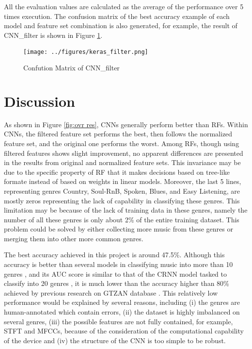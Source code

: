 \documentclass[sigconf ,nonacm]{acmart}
\begin{document}
All the evaluation values are calculated as the average of the performance over 5 times execution. The confusion matrix of the best accuracy example of each model and feature set combination is also generated, for example, the result of CNN\_filter is shown in Figure \ref{fig:cnn filter cm}.

\begin{figure}[b]
  \texttt{[image: ../figures/keras\_filter.png]}
  \caption{Confution Matrix of CNN\_filter}
  \label{fig:cnn filter cm}
\end{figure}


\section{Discussion}

As shown in Figure \ref{fig:ovr res}, CNNs generally perform better than RFs. Within CNNs, the filtered feature set performs the best, then follows the normalized feature set, and the original one performs the worst. Among RFs, though using filtered features shows slight improvement, no apparent differences are presented in the results from original and normalized feature sets. This invariance may be due to the specific property of RF that it makes decisions based on tree-like formate instead of based on weights in linear models. Moreover, the last 5 lines, representing genres Country, Soul-RnB, Spoken, Blues, and Easy Listening, are mostly zeros representing the lack of capability in classifying these genres. This limitation may be because of the lack of training data in these genres, namely the number of all these genres is only about 2\% of the entire training dataset. This problem could be solved by either collecting more music from these genres or merging them into other more common genres.

The best accuracy achieved in this project is around 47.5\%. Although this accuracy is better than several models in classifying music into more than 10 genres \cite{comparison}, and its AUC score is similar to that of the CRNN model tasked to classify into 20 genres \cite{crnn}, it is much lower than the accuracy higher than 80\% achieved by previous research on GTZAN database \cite{lee2009automatic,fu2010feature,li2010automatic}. This relatively low performance would be explained by several reasons, including (i) the genres are human-annotated which contain errors, (ii) the dataset is highly imbalanced on several genres, (iii) the possible features are not fully contained, for example, STFT and MFCCs, because of the consideration of the computational capability of the device and (iv) the structure of the CNN is too simple to be robust.
\end{document}
